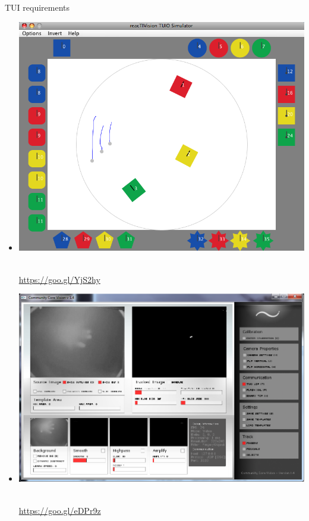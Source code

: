 \begin{frame}
\begin{block}{TUI requirements}
\begin{minipage}{1.0\linewidth}
\begin{itemize}
\begin{scriptsize}
\end{scriptsize}%
\item[] \includegraphics[scale=.08]{images/reactivision04.png}$\;$
\begin{scriptsize}
\url{https://goo.gl/YjS2hy}
\end{scriptsize}
\item[] \includegraphics[scale=.09]{images/CCV.png}$\;$
\begin{scriptsize}
\url{https://goo.gl/eDPr9z}
\end{scriptsize}
\end{itemize}
\end{minipage}
\end{block}
\end{frame}

